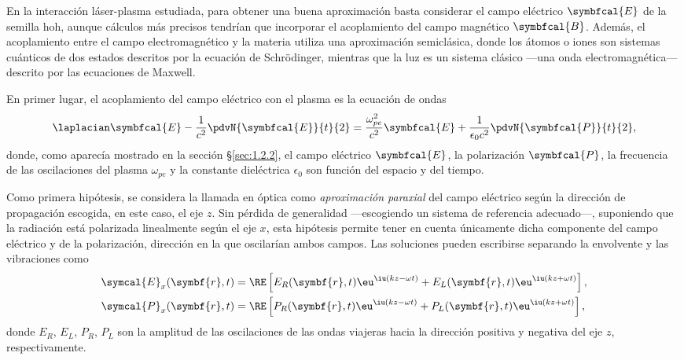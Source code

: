 En la interacción láser-plasma estudiada, para obtener una buena aproximación basta considerar el campo eléctrico $\symbfcal{E}$ de la semilla \acrshort{hoh}, aunque cálculos más precisos tendrían que incorporar el acoplamiento del campo magnético $\symbfcal{B}$. Además, el acoplamiento entre el campo electromagnético y la materia utiliza una aproximación semiclásica, donde los átomos o iones son sistemas cuánticos de dos estados descritos por la ecuación de Schrödinger, mientras que la luz es un sistema clásico ---una onda electromagnética--- descrito por las ecuaciones de Maxwell. 

En primer lugar, el acoplamiento del campo eléctrico con el plasma es la ecuación de ondas 
\begin{equation}\label{eq:3.0}
  \laplacian \symbfcal{E} - \frac{1}{c^{2}}\pdvN{\symbfcal{E}}{t}{2} = \frac{\omega^{2}_{pe}}{c^{2}}\symbfcal{E} + \frac{1}{\epsilon_{0}c^{2}}\pdvN{\symbfcal{P}}{t}{2},
\end{equation}
donde, como aparecía mostrado en la sección \S\ref{sec:1.2.2}, el campo eléctrico $\symbfcal{E}$, la polarización $\symbfcal{P}$, la frecuencia de las oscilaciones del plasma $\omega_{pe}$ y la constante dieléctrica $\epsilon_{0}$ son función del espacio y del tiempo. 

Como primera hipótesis, se considera la llamada en óptica\autocite{Born2019} como \emph{aproximación paraxial} del campo eléctrico según la dirección de propagación escogida, en este caso, el eje $z$. Sin pérdida de generalidad ---escogiendo un sistema de referencia adecuado---, suponiendo que la radiación está polarizada linealmente según el eje $x$, esta hipótesis permite tener en cuenta únicamente dicha componente del campo eléctrico y de la polarización, dirección en la que oscilarían ambos campos. Las soluciones pueden escribirse separando la envolvente y las vibraciones como
\begin{align}
  \label{eq:3.1a}
  \symcal{E}_{x}(\symbf{r},t) &= \RE \left[E_{R}(\symbf{r},t)\eu^{\iu (kz - \omega t)} + E_{L}(\symbf{r},t)\eu^{\iu (kz + \omega t)}\right], \\
  \label{eq:3.1b}
  \symcal{P}_{x}(\symbf{r},t) &= \RE \left[P_{R}(\symbf{r},t)\eu^{\iu (kz - \omega t)} + P_{L}(\symbf{r},t)\eu^{\iu (kz + \omega t)}\right], 
\end{align}
donde $E_{R}$, $E_{L}$, $P_{R}$, $P_{L}$ son la amplitud de las oscilaciones de las ondas viajeras hacia la dirección positiva y negativa del eje $z$, respectivamente. 

